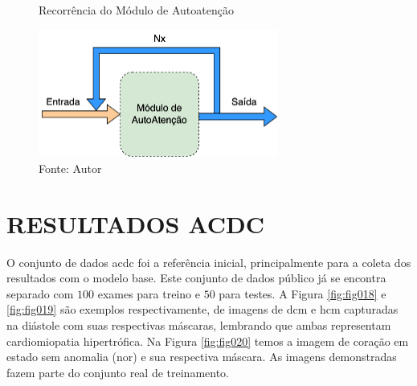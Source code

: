 \begin{figure}[H]
    \centering
    \caption{Recorrência do Módulo de Autoatenção}
    \includegraphics[width=0.7\textwidth]{figures/fig030.png}
    \caption*{Fonte: Autor}
    \label{fig:fig030}
\end{figure}







\section{RESULTADOS ACDC}
\label{sec:resultados_acdc}

O conjunto de dados \gls{acdc} foi a referência inicial, principalmente para a coleta dos resultados com o modelo base. Este conjunto de dados público já se encontra separado com $100$ exames para treino e $50$ para testes. A Figura \ref{fig:fig018} e \ref{fig:fig019} são exemplos respectivamente, de imagens de \gls{dcm} e \gls{hcm} capturadas na diástole com suas respectivas máscaras, lembrando que ambas representam cardiomiopatia hipertrófica. Na Figura \ref{fig:fig020} temos a imagem de coração em estado sem anomalia (\gls{nor}) e sua respectiva máscara. As imagens demonstradas fazem parte do conjunto real de treinamento.

